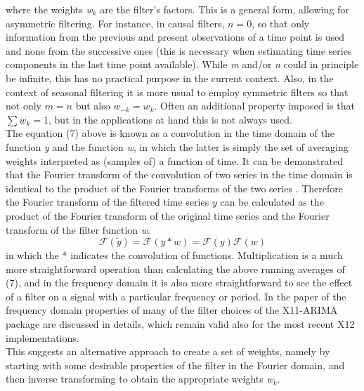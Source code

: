 \documentclass[english,blauw]{cbsdiscussionpaper}
\begin{document}
where the weights \textit{w$_k$} are the filter’s factors. This is a general form, allowing for asymmetric filtering. For instance, in causal filters, $n=0$, so that only information from the previous and present observations of a time point is used and none from the successive ones (this is necessary when estimating time series components in the last time point available). While \textit{m} and/or \textit{n} could in principle be infinite, this has no practical purpose in the current context. Also, in the context of seasonal filtering it is more usual to employ symmetric filters so that not only $m=n$ but also $w_{-k} = w_k$. Often an additional property imposed is that $\sum w_k = 1$, but in the applications at hand this is not always used. \\ The equation (7) above is known as a convolution in the time domain of the function \textit{y} and the function \textit{w}, in which the latter is simply the set of averaging weights interpreted as (samples of) a function of time. It can be demonstrated that the Fourier transform of the convolution of two series in the time domain is identical to the product of the Fourier transforms of the two series \citep{bracewell1965}. Therefore the Fourier transform of the filtered time series $\textit{\~ y}$ can be calculated as the product of the Fourier transform of the original time series and the Fourier transform of the filter function \textit{w}.
\begin{equation}
\mathcal{F}(\tilde {y}) = \mathcal{F}(y * w) = \mathcal{F}(y)\mathcal{F}(w)
\end{equation}
in which the * indicates the convolution of functions. Multiplication is a much more straightforward operation than calculating the above running averages of (7), and in the frequency domain it is also more straightforward to see the effect of a filter on a signal with a particular frequency or period. In the paper of \citep{dageal1996} the frequency domain properties of many of the filter choices of the X11-ARIMA package are discussed in details, which remain valid also for the most recent X12 implementations.\\ This suggests an alternative approach to create a set of weights, namely by starting with some desirable properties of the filter in the Fourier domain, and then inverse transforming to obtain the appropriate weights \textit{w$_k$}.\\
\end{document}
